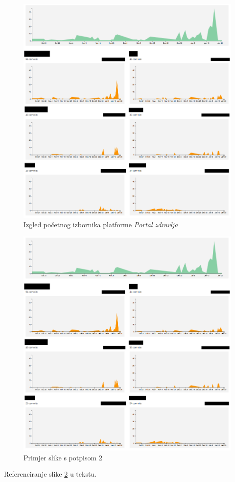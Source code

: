 		\begin{figure}[H]
			\includegraphics[scale=0.4]{slike/aktivnost.PNG} %
			\centering
			\caption{Izgled početnog izbornika platforme \textit{Portal zdravlja}}
			\label{fig:portal-zdravlja}
		\end{figure}
		
		\begin{figure}[H]
			\includegraphics[width=\textwidth]{slike/aktivnost.PNG} %
			\caption{Primjer slike s potpisom 2}
			\label{fig:promjene2} %
		\end{figure}
		
		Referenciranje slike \ref{fig:promjene2} u tekstu.
		
		\eject
		
	
